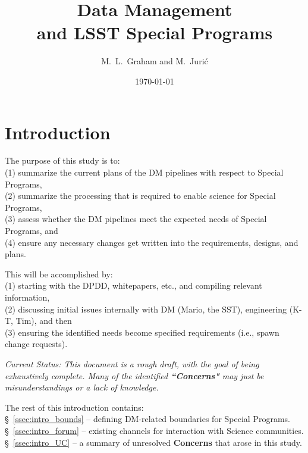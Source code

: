 \documentclass[DM,lsstdraft,toc]{lsstdoc}
\title[LSST Special Programs]{Data Management \\ and LSST Special Programs}
\author{M.~L.~Graham and M.~Juri\'{c}}
\date{\today}
\begin{document}
\maketitle




\section{Introduction} \label{sec:intro}

\noindent The purpose of this study is to: \\
(1) summarize the current plans of the DM pipelines with respect to Special Programs, \\
(2) summarize the processing that is required to enable science for Special Programs, \\
(3) assess whether the DM pipelines meet the expected needs of Special Programs, and \\
(4) ensure any necessary changes get written into the requirements, designs, and plans.

\noindent This will be accomplished by: \\
(1) starting with the DPDD, whitepapers, etc., and compiling relevant information, \\
(2) discussing initial issues internally with DM (Mario, the SST), engineering (K-T, Tim), and then \\
(3) ensuring the identified needs become specified requirements (i.e., spawn change requests).

{\it Current Status: This document is a rough draft, with the goal of being exhaustively complete. Many of the identified \textbf{``Concerns"} may just be misunderstandings or a lack of knowledge.}

The rest of this introduction contains: \\
\S~\ref{ssec:intro_bounds} -- defining DM-related boundaries for Special Programs. \\
\S~\ref{ssec:intro_forum} -- existing channels for interaction with Science communities. \\
\S~\ref{ssec:intro_UC} -- a summary of unresolved \textbf{Concerns} that arose in this study.
\end{document}
